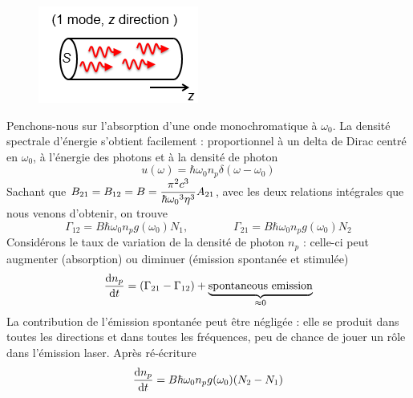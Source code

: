 	\begin{figure}
	\vspace{-5mm}
	\includegraphics[scale=0.75]{ch2/image14.png}
	\end{figure}
	Penchons-nous sur l'absorption d'une onde monochromatique à $\omega_0$. La densité 
	spectrale d'énergie s'obtient facilement : proportionnel à un delta de Dirac centré
	en $\omega_0$, à l'énergie des photons et à la densité de photon
	\begin{equation}
	u(\omega ) = \hbar {\omega _0}{n_p}\delta (\omega  - {\omega _0})
	\end{equation}
	Sachant que $\displaystyle {B_{21}} = {B_{12}} = B = \frac{{{\pi ^2}{c^3}}}{{\hbar {\omega _0}^3{\eta ^3}}}
	{A_{21}}$, avec les deux relations intégrales que nous venons d'obtenir, on trouve
	\begin{equation}
	{\Gamma _{12}} = B\hbar {\omega _0}{n_p}g({\omega _0}){N_1},\qquad\qquad 
	{\Gamma _{21}} = B\hbar {\omega _0}{n_p}g({\omega _0}){N_2}
	\end{equation}
	Considérons le taux de variation de la densité de photon $n_p$ : celle-ci peut augmenter 
	(absorption) ou diminuer (émission spontanée et stimulée)
	\begin{equation}
	\frac{{{\rm{d}}{n_p}}}{{{\rm{d}}t}} = ({\Gamma _{21}} - {\Gamma _{12}}) + \underbrace{\text{spontaneous emission}}_{\approx 0}
	\end{equation}
	La contribution de l'émission spontanée peut être négligée : elle se produit dans toutes les 
	directions et dans toutes les fréquences, peu de chance de jouer un rôle dans l'émission laser. 
	Après ré-écriture
	\begin{equation}
	\frac{{{\rm{d}}{n_p}}}{{{\rm{d}}t}} = B\hbar {\omega _0}{n_p}g({\omega _0})({N_2} - {N_1})
	\end{equation}
	
